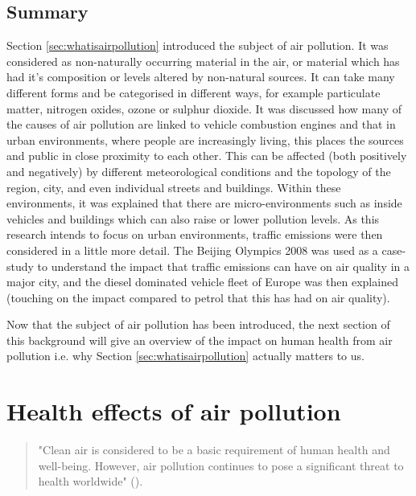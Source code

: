 \subsection{Summary}
\label{subsec:whatissummary}

Section \ref{sec:whatisairpollution} introduced the subject of air pollution. It was considered as non-naturally occurring material in the air, or material which has had it's composition or levels altered by non-natural sources. It can take many different forms and be categorised in different ways, for example particulate matter, nitrogen oxides, ozone or sulphur dioxide. It was discussed how many of the causes of air pollution are linked to vehicle combustion engines and that in urban environments, where people are increasingly living, this places the sources and public in close proximity to each other. This can be affected (both positively and negatively) by different meteorological conditions and the topology of the region, city, and even individual streets and buildings. Within these environments, it was explained that there are micro-environments such as inside vehicles and buildings which can also raise or lower pollution levels. As this research intends to focus on urban environments, traffic emissions were then considered in a little more detail. The Beijing Olympics 2008 was used as a case-study to understand the impact that traffic emissions can have on air quality in a major city, and the diesel dominated vehicle fleet of Europe was then explained (touching on the impact compared to petrol that this has had on air quality).

Now that the subject of air pollution has been introduced, the next section of this background will give an overview of the impact on human health from air pollution i.e. why Section \ref{sec:whatisairpollution} actually matters to us.

\newpage
\section{Health effects of air pollution}
\label{sec:healtheffects}

\begin{quote}
"Clean air is considered to be a basic requirement of human health and well-being. However, air pollution continues to pose a significant threat to health worldwide" (\cite{WorldHealthOrganisation2006}).
\end{quote}

